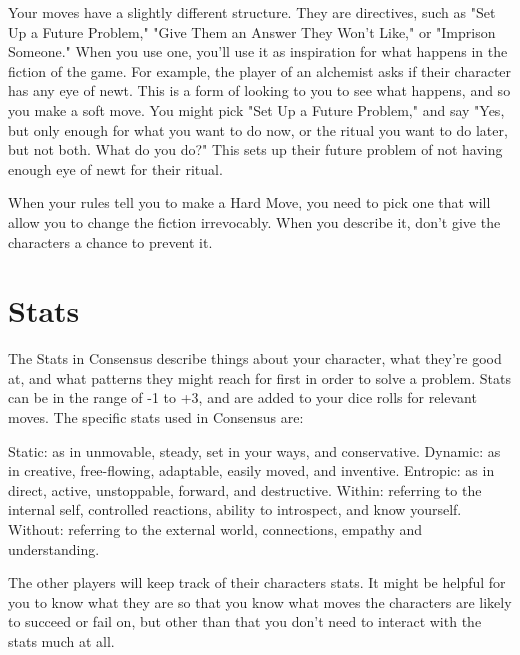 \documentclass[
  oneside,
  statementpaper,
  9pt]{memoir}
\begin{document}
\begin{MC}

Your moves have a slightly different structure. They are directives, such as "Set Up a Future Problem," "Give Them an Answer They Won't Like," or "Imprison Someone." When you use one, you'll use it as inspiration for what happens in the fiction of the game. For example, the player of an alchemist asks if their character has any eye of newt. This is a form of looking to you to see what happens, and so you make a soft move. You might pick "Set Up a Future Problem," and say "Yes, but only enough for what you want to do now, or the ritual you want to do later, but not both. What do you do?" This sets up their future problem of not having enough eye of newt for their ritual.

When your rules tell you to make a Hard Move, you need to pick one that will allow you to change the fiction irrevocably. When you describe it, don't give the characters a chance to prevent it. 

\end{MC}

\hypertarget{stats}{%
\section{Stats}\label{stats}}

\begin{Player}

The Stats in Consensus describe things about your character, what they’re good at, and what patterns they might reach for first in order to solve a problem. Stats can be in the range of -1 to +3, and are added to your dice rolls for relevant moves. The specific stats used in Consensus are:

Static: as in unmovable, steady, set in your ways, and conservative.  
Dynamic: as in creative, free-flowing, adaptable, easily moved, and inventive.  
Entropic: as in direct, active, unstoppable, forward, and destructive.  
Within: referring to the internal self, controlled reactions, ability to introspect, and know yourself.  
Without: referring to the external world, connections, empathy and understanding.

\end{Player}

\begin{MC}

The other players will keep track of their characters stats. It might be helpful for you to know what they are so that you know what moves the characters are likely to succeed or fail on, but other than that you don't need to interact with the stats much at all.

\end{MC}
\end{document}
